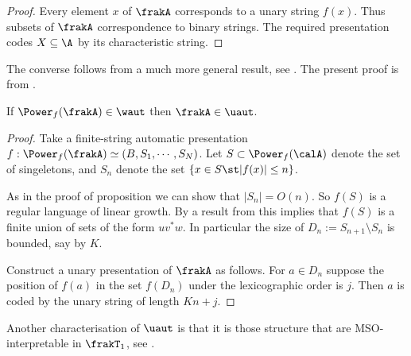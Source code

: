 \begin{proof}
Every element $x$ of $\frakA$ corresponds to a unary string $f(x)$. Thus subsets of $\frakA$ correspondence
to binary strings. The required presentation codes $X \subseteq\A$ by its characteristic string.
\end{proof}

The converse follows from a much more general result, see \cite{CoLo06}. The present proof is from \cite{Bara07}.

\begin{proposition}
 If $\Power_f(\frakA) \in \waut$ then $\frakA \in \uaut$.
\end{proposition}

\begin{proof}
Take a finite-string automatic presentation $f: \Power_f(\frakA) \simeq (B,S_1,\cdots,S_N)$. 
Let $S \subset \Power_f(\calA)$ denote the set of singeletons, and
$S_n$ denote the set $\{x \in S \st |f(x)| \leq n\}$.

As in the proof of proposition \cite{} we can show that $|S_n| = O(n)$. So $f(S)$ is a regular language
of linear growth. By a result from \cite{SYZS92} this implies that $f(S)$ is a finite union of sets of the form $uv^\ast w$.
In particular the size of $D_n := S_{n+1} \setminus S_n$ is bounded, say by $K$.

Construct a unary presentation of $\frakA$ as follows. For $a \in D_n$ suppose the position of $f(a)$ in the set
$f(D_n)$ under the lexicographic order is $j$. Then $a$ is coded by the unary string of length $Kn + j$.
\end{proof}

Another characterisation of $\uaut$ is that it is those structure that are MSO-interpretable in $\frakT_1$, see \cite{}.
% 


